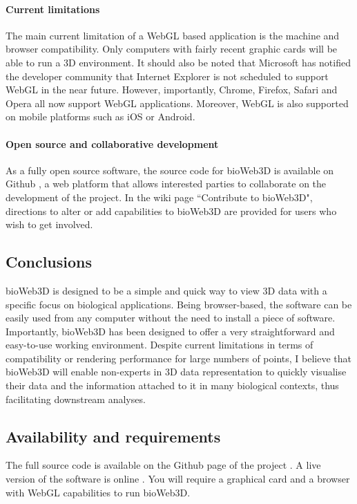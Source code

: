 		\paragraph{Current limitations}
The main current limitation of a WebGL based application is the machine and browser compatibility. Only computers with fairly recent graphic cards will be able to run a 3D environment. It should also be noted that Microsoft has notified the developer community that Internet Explorer is not scheduled to support WebGL in the near future. However, importantly, Chrome, Firefox, Safari and Opera all now support WebGL applications. Moreover, WebGL is also supported on mobile platforms such as iOS or Android. \cite{caniuse}


		\paragraph{Open source and collaborative development}
As a fully open source software, the source code for bioWeb3D is available on Github \cite{github}, a web platform that allows interested parties to collaborate on the development of the project. In the wiki page ``Contribute to bioWeb3D", directions to alter or add capabilities to bioWeb3D are provided for users who wish to get involved.

	\subsection{Conclusions}
bioWeb3D is designed to be a simple and quick way to view 3D data with a specific focus on biological applications.  Being browser-based, the software can be easily used from any computer without the need to install a piece of software. Importantly, bioWeb3D has been designed to offer a very straightforward and easy-to-use working environment. Despite current limitations in terms of compatibility or rendering performance for large numbers of points, I believe that bioWeb3D will enable non-experts in 3D data representation to quickly visualise their data and the information attached to it in many biological contexts, thus facilitating downstream analyses.

	\subsection{Availability and requirements}
The full source code is available on the Github page of the project \cite{github}. A live version of the software is online \cite{bioWeb3D}. You will require a graphical card and a browser with WebGL capabilities to run bioWeb3D.


